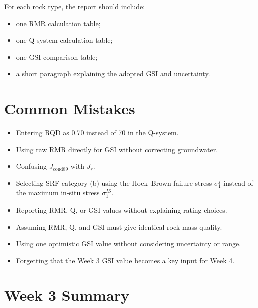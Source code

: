 \documentclass[a4paper,12pt]{article}
\begin{document}
\begin{calcbox}
For each rock type, the report should include:
\begin{itemize}
    \item one RMR calculation table;
    \item one Q-system calculation table;
    \item one GSI comparison table;
    \item a short paragraph explaining the adopted GSI and uncertainty.
\end{itemize}
\end{calcbox}

\section{Common Mistakes}

\begin{errbox}
\begin{itemize}
    \item Entering RQD as 0.70 instead of 70 in the Q-system.
    \item Using raw RMR directly for GSI without correcting groundwater.
    \item Confusing \(J_{\text{cond89}}\) with \(J_r\).
    \item Selecting SRF category (b) using the Hoek--Brown failure stress \(\sigma_1^f\)
    instead of the maximum in-situ stress \(\sigma_1^{IS}\).
    \item Reporting RMR, Q, or GSI values without explaining rating choices.
    \item Assuming RMR, Q, and GSI must give identical rock mass quality.
    \item Using one optimistic GSI value without considering uncertainty or range.
    \item Forgetting that the Week 3 GSI value becomes a key input for Week 4.
\end{itemize}
\end{errbox}

\section{Week 3 Summary}
\end{document}

